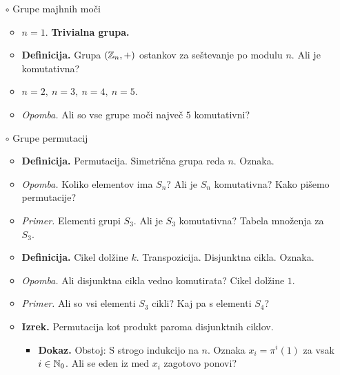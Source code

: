\begin{enumerate}
    \item[$\circ$] Grupe majhnih moči
    \begin{itemize}
        \item $n=1$. \textbf{Trivialna grupa.}
        \item \colorbox{purple!30}{\textbf{Definicija.}} Grupa $(\mathbb{Z}_n, +)$ ostankov za seštevanje po modulu $n$. Ali je komutativna?
        \item $n=2, \ n=3, \ n = 4, \ n= 5$.
        \item \colorbox{yellow!30}{\emph{Opomba.}} Ali so vse grupe moči največ $5$ komutativni?
    \end{itemize}

    \item[$\circ$] Grupe permutacij
    \begin{itemize}
        \item \colorbox{purple!30}{\textbf{Definicija.}} Permutacija.  Simetrična grupa reda $n$. Oznaka.
        \item \colorbox{yellow!30}{\emph{Opomba.}} Koliko elementov ima $S_n$? Ali je $S_n$ komutativna? Kako pišemo permutacije?
        \item \colorbox{yellow!30}{\emph{Primer.}} Elementi grupi $S_3$. Ali je $S_3$ komutativna? Tabela množenja za $S_3$.
        \item \colorbox{purple!30}{\textbf{Definicija.}} Cikel dolžine $k$. Transpozicija. Disjunktna cikla. Oznaka.
        \item \colorbox{yellow!30}{\emph{Opomba.}} Ali disjunktna cikla vedno komutirata? Cikel dolžine $1$. 
        \item \colorbox{yellow!30}{\emph{Primer.}} Ali so vsi elementi $S_3$ cikli? Kaj pa s elementi $S_4$?
        \item \colorbox{blue!30}{\textbf{Izrek.}} Permutacija kot produkt paroma disjunktnih ciklov.
        \begin{itemize}
            \item \colorbox{green!30}{\textbf{Dokaz.}} Obstoj: S strogo indukcijo na $n$. Oznaka $x_i = \pi^i(1)$ za vsak $i \in \mathbb{N}_0$. Ali se eden iz med $x_i$ zagotovo ponovi?
            

\end{itemize}
\end{itemize}
\end{enumerate}
